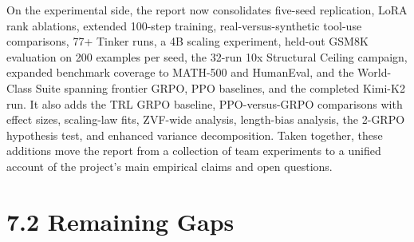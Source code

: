 \documentclass[
  american,
  11pt,
  a4paper,
  oneside]{report}
\begin{document}
On the experimental side, the report now consolidates five-seed
replication, LoRA rank ablations, extended 100-step training,
real-versus-synthetic tool-use comparisons, 77+ Tinker runs, a 4B
scaling experiment, held-out GSM8K evaluation on 200 examples per seed,
the 32-run 10x Structural Ceiling campaign, expanded benchmark coverage
to MATH-500 and HumanEval, and the World-Class Suite spanning frontier
GRPO, PPO baselines, and the completed Kimi-K2 run. It also adds the TRL
GRPO baseline, PPO-versus-GRPO comparisons with effect sizes,
scaling-law fits, ZVF-wide analysis, length-bias analysis, the 2-GRPO
hypothesis test, and enhanced variance decomposition. Taken together,
these additions move the report from a collection of team experiments to
a unified account of the project's main empirical claims and open
questions.

\section{7.2 Remaining Gaps}\label{remaining-gaps}
\end{document}
